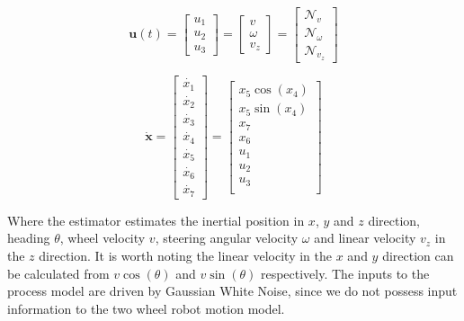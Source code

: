 \documentclass[letterpaper, 10 pt, conference]{ieeeconf}
\begin{document}
\begin{equation}
    \textbf{u}(t)
        = \begin{bmatrix}
            u_{1} \\
            u_{2} \\
            u_{3}
        \end{bmatrix}
        = \begin{bmatrix}
            v \\
            \omega \\
            v_{z}
        \end{bmatrix}
        = \begin{bmatrix}
            \mathcal{N}_{v} \\
            \mathcal{N}_{\omega} \\
            \mathcal{N}_{v_{z}}
        \end{bmatrix}
\end{equation}

\begin{equation}
    \dot{\textbf{x}} = \begin{bmatrix}
        \dot{x_{1}} \\ 
        \dot{x_{2}} \\ 
        \dot{x_{3}} \\ 
        \dot{x_{4}} \\
        \dot{x_{5}} \\
        \dot{x_{6}} \\
        \dot{x_{7}}
    \end{bmatrix} =
    \begin{bmatrix}
        x_{5} \cos(x_{4}) \\
        x_{5} \sin(x_{4}) \\
        x_{7} \\
        x_{6} \\
        u_{1} \\
        u_{2} \\
        u_{3} \\
    \end{bmatrix}
\end{equation}

Where the estimator estimates the inertial position in $x$, $y$ and $z$
direction, heading $\theta$, wheel velocity $v$, steering angular velocity
$\omega$ and linear velocity $v_{z}$ in the $z$ direction. It is worth
noting the linear velocity in the $x$ and $y$ direction can be calculated
from $v \cos(\theta)$ and $v \sin(\theta)$ respectively. The inputs to the
process model are driven by Gaussian White Noise, since we do not possess
input information to the two wheel robot motion model.
\end{document}
